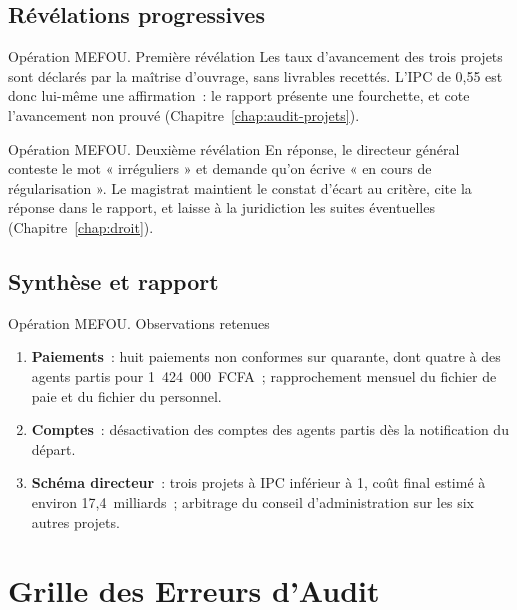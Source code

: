 \subsection{Révélations progressives}

\begin{boxscenario}{Opération MEFOU. Première révélation}
Les taux d'avancement des trois projets sont déclarés par la maîtrise
d'ouvrage, sans livrables recettés. L'IPC de 0,55 est donc lui-même une
affirmation~: le rapport présente une fourchette, et cote \NEK{}
l'avancement non prouvé (Chapitre~\ref{chap:audit-projets}).
\end{boxscenario}

\begin{boxscenario}{Opération MEFOU. Deuxième révélation}
En réponse, le directeur général conteste le mot « irréguliers » et
demande qu'on écrive « en cours de régularisation ». Le magistrat
maintient le constat d'écart au critère, cite la réponse dans le rapport,
et laisse à la juridiction les suites éventuelles
(Chapitre~\ref{chap:droit}).
\end{boxscenario}

\subsection{Synthèse et rapport}

\begin{boxscenario}{Opération MEFOU. Observations retenues}
\begin{enumerate}
    \item \textbf{Paiements}~: huit paiements non conformes sur quarante,
          dont quatre à des agents partis pour 1~424~000~FCFA~;
          rapprochement mensuel du fichier de paie et du fichier du
          personnel.
    \item \textbf{Comptes}~: désactivation des comptes des agents partis
          dès la notification du départ.
    \item \textbf{Schéma directeur}~: trois projets à IPC inférieur à 1,
          coût final estimé à environ 17,4~milliards~; arbitrage du
          conseil d'administration sur les six autres projets.
\end{enumerate}
\end{boxscenario}

\section{Grille des Erreurs d'Audit}
\label{sec:c26-erreurs}

